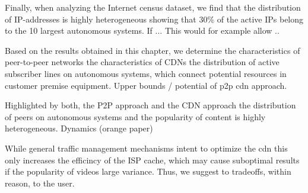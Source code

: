 Finally, when analyzing the Internet census dataset, we find that the distribution of IP-addresses is highly heterogeneous showing that 30\% of the active IPs belong to the 10 largest autonomous systems.
If ...
This would for example allow ..

Based on the results obtained in this chapter, we determine
the characteristics of peer-to-peer networks
the characteristics of CDNs
the distribution of active subscriber lines on autonomous systems, which connect potential resources in customer premise equipment.
Upper bounds / potential of p2p cdn approach.

Highlighted by both, the P2P approach and the CDN approach the distribution of peers on autonomous systems and the popularity of content is highly heterogeneous.
Dynamics (orange paper)

While general traffic management mechanisms intent to optimize the cdn
this only increases the efficincy of the ISP cache, which may cause suboptimal results if the popularity of videos large variance.
Thus, we suggest to  tradeoffs, within reason, to the user.
